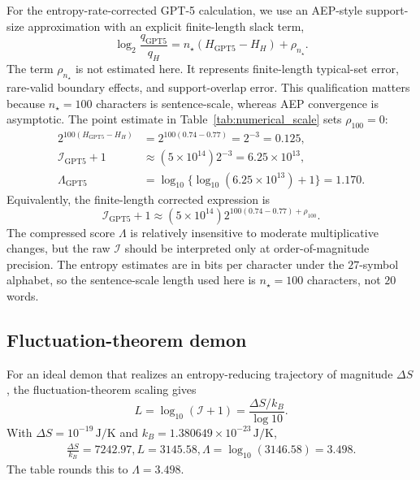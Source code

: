 \documentclass[
  aps,
  prresearch,
  reprint,
  amsmath,
  amssymb,
  superscriptaddress,
  nofootinbib,
  longbibliography
]{revtex4-2}
\def\EQSP{3pt}
\newcommand{\cgather}[2][\EQSP]{\begingroup\setlength\abovedisplayskip{#1}\setlength\belowdisplayskip{#1}\begin{gather} #2 \end{gather}\endgroup\noindent}
\newcommand{\calI}{\mathcal{I}}
\begin{document}
For the entropy-rate-corrected GPT-5 calculation, we use an AEP-style support-size approximation with an explicit finite-length slack term,
\begin{equation}
    \log_2\frac{q_{\mathrm{GPT5}}}{q_H}
    =
    n_\star(H_{\mathrm{GPT5}}-H_H)+\rho_{n_\star}.
    \label{eq:appendix_entropy_ai_lift_slack}
\end{equation}
The term \(\rho_{n_\star}\) is not estimated here. It represents finite-length typical-set error, rare-valid boundary effects, and support-overlap error. This qualification matters because \(n_\star=100\) characters is sentence-scale, whereas AEP convergence is asymptotic. The point estimate in Table~\ref{tab:numerical_scale} sets \(\rho_{100}=0\):
\begin{align}
    2^{100(H_{\mathrm{GPT5}}-H_H)}
    &=
    2^{100(0.74-0.77)}
    =2^{-3}=0.125,\\
    \calI_{\mathrm{GPT5}}+1
    &\approx
    (5\times10^{14})2^{-3}
    =6.25\times10^{13},\\
    \Lambda_{\mathrm{GPT5}}
    &=
    \log_{10}\{\log_{10}(6.25\times10^{13})+1\}
    =1.170 .
\end{align}
Equivalently, the finite-length corrected expression is
\begin{equation}
    \calI_{\mathrm{GPT5}}+1
    \approx
    (5\times10^{14})2^{100(0.74-0.77)+\rho_{100}}.
\end{equation}
The compressed score \(\Lambda\) is relatively insensitive to moderate multiplicative changes, but the raw \(\calI\) should be interpreted only at order-of-magnitude precision. The entropy estimates are in bits per character under the \(27\)-symbol alphabet, so the sentence-scale length used here is \(n_\star=100\) characters, not \(20\) words.

\subsection{Fluctuation-theorem demon}

For an ideal demon that realizes an entropy-reducing trajectory of magnitude \(\Delta S\), the fluctuation-theorem scaling gives
\begin{equation}
    L=\log_{10}(\calI+1)
      =\frac{\Delta S/k_B}{\log 10}.
    \label{eq:appendix_fluctuation_demon}
\end{equation}
With \(\Delta S=10^{-19}\,\mathrm{J/K}\) and \(k_B=1.380649\times10^{-23}\,\mathrm{J/K}\),
\cgather{
    \frac{\Delta S}{k_B} = 7242.97,
    L = 3145.58, 
    \Lambda = \log_{10}(3146.58)=3.498.
}
The table rounds this to \(\Lambda=3.498\).
\end{document}

